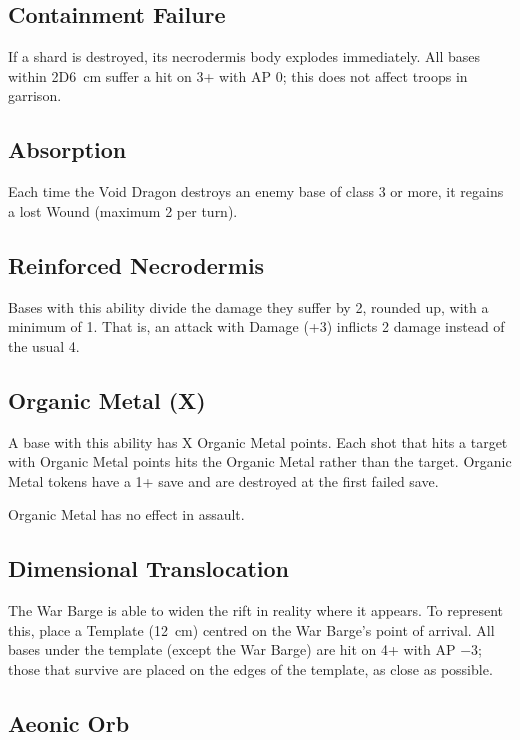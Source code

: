 \subsection{Containment Failure}

If a shard is destroyed, its necrodermis body explodes immediately. All bases within 2D6~cm suffer a hit on 3+ with AP 0; this does not affect troops in garrison.

\subsection{Absorption}

Each time the Void Dragon destroys an enemy base of class 3 or more, it regains a lost Wound (maximum 2 per turn).

\subsection{Reinforced Necrodermis}

Bases with this ability divide the damage they suffer by 2, rounded up, with a minimum of 1. That is, an attack with Damage (+3) inflicts 2 damage instead of the usual 4.

\subsection{Organic Metal (X)}

A base with this ability has X Organic Metal points. Each shot that hits a target with Organic Metal points hits the Organic Metal rather than the target. Organic Metal tokens have a 1+ save and are destroyed at the first failed save.

Organic Metal has no effect in assault.

\subsection{Dimensional Translocation}

The War Barge is able to widen the rift in reality where it appears. To represent this, place a Template (12~cm) centred on the War Barge's point of arrival. All bases under the template (except the War Barge) are hit on 4+ with AP $-3$; those that survive are placed on the edges of the template, as close as possible.

\subsection{Aeonic Orb}

